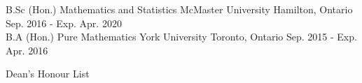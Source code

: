 

\begin{cventries}

  \cventry
    {B.Sc (Hon.) Mathematics and Statistics} %
    {McMaster University} %
    {Hamilton, Ontario} %
    {Sep. 2016 - Exp. Apr. 2020} %
    {
    }\\
    \cventry
    {B.A (Hon.) Pure Mathematics} %
    {York University} %
    {Toronto, Ontario} %
    {Sep. 2015 - Exp. Apr. 2016} %
    {
      \begin{cvitems} %
        \item {Dean's Honour List}
      \end{cvitems}
    }


\end{cventries}
